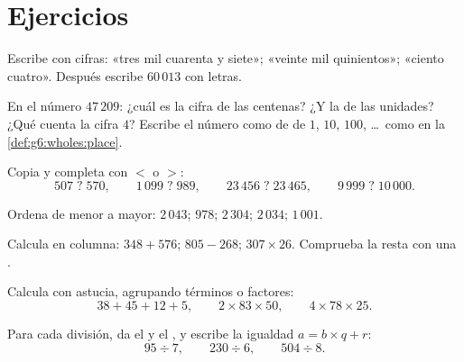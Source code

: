 \section{Ejercicios}

\begin{exercise}[$\star$]\label{exo:g6:wholes:1}
Escribe con cifras: «tres mil cuarenta y siete»; «veinte mil
quinientos»; «ciento cuatro». Después escribe $60\,013$ con letras.
\end{exercise}

\begin{exercise}[$\star$]\label{exo:g6:wholes:2}
En el número $47\,209$: ¿cuál es la cifra de las centenas? ¿Y la de
las unidades? ¿Qué cuenta la cifra $4$? Escribe el número como  de
 de $1$, $10$, $100$, \dots\ como en la
\cref{def:g6:wholes:place}.
\end{exercise}

\begin{exercise}[$\star$]\label{exo:g6:wholes:3}
Copia y completa con $<$ o $>$:
\[
507 \;?\; 570, \qquad
1\,099 \;?\; 989, \qquad
23\,456 \;?\; 23\,465, \qquad
9\,999 \;?\; 10\,000 .
\]
\end{exercise}

\begin{exercise}[$\star$]\label{exo:g6:wholes:4}
Ordena de menor a mayor: $2\,043$; $978$; $2\,304$; $2\,034$;
$1\,001$.
\end{exercise}

\begin{exercise}[$\star$]\label{exo:g6:wholes:5}
Calcula en columna: $348 + 576$; \quad $805 - 268$; \quad
$307 \times 26$. Comprueba la resta con una .
\end{exercise}

\begin{exercise}[$\star$]\label{exo:g6:wholes:6}
Calcula con astucia, agrupando términos o factores:
\[
38 + 45 + 12 + 5, \qquad
2 \times 83 \times 50, \qquad
4 \times 78 \times 25 .
\]
\end{exercise}

\begin{exercise}[$\star$]\label{exo:g6:wholes:7}
Para cada división, da el  y el , y escribe la
igualdad $a = b \times q + r$:
\[
95 \div 7, \qquad
230 \div 6, \qquad
504 \div 8 .
\]
\end{exercise}


